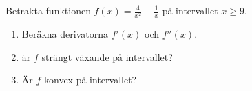 


Betrakta funktionen $ f(x) = \frac{4}{x^2}-\frac{1}{x}$ på intervallet $ x \geq 9$.
\begin{enumerate}
\item Beräkna derivatorna $f'(x)$ och $ f''(x)$.
\item är $f$ strängt växande på intervallet?
\item Är $f$ konvex på intervallet?
\end{enumerate}